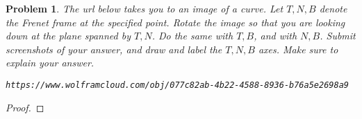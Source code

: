 \documentclass[11pt]{article}
\newtheorem{problem}{Problem}
\begin{document}
\pagebreak

\begin{problem}
The url below takes you to an image of a curve. Let $T,N,B$ denote the Frenet frame at the specified point. Rotate the image so that you are looking down at the plane spanned by $T,N$. Do the same with $T,B$, and with $N,B$. Submit screenshots of your answer, and draw and label the $T,N,B$ axes. Make sure to explain your answer. 

\texttt{https://www.wolframcloud.com/obj/077c82ab-4b22-4588-8936-b76a5e2698a9}
\end{problem}


\begin{proof}

\end{proof}
\end{document}
